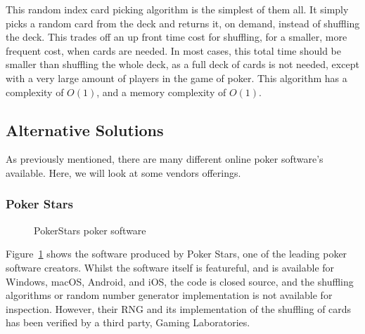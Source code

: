 \vspace{0.3cm}

This random index card picking algorithm is the simplest of them all. It simply
picks a random card from the deck and returns it, on demand, instead of
shuffling the deck. This trades off an up front time cost for shuffling, for
a smaller, more frequent cost, when cards are needed. In most cases, this
total time should be smaller than shuffling the whole deck, as a full deck
of cards is not needed, except with a very large amount of players in the game
of poker. This algorithm has a complexity of $O(1)$, and a memory complexity
of $O(1)$.

\subsection{Alternative Solutions}

As previously mentioned, there are many different online poker software's
available. Here, we will look at some vendors offerings.

\subsubsection{Poker Stars}

\begin{figure}[H]
    \caption{PokerStars poker software}%
    \label{fig:pokerstars}
\end{figure}

Figure~\ref{fig:pokerstars} shows the software produced by Poker Stars, one
of the leading poker software creators. Whilst the software itself is
featureful, and is available for Windows, macOS, Android, and iOS, the code
is closed source, and the shuffling algorithms or random number generator
implementation is not available for inspection. However, their RNG and its
implementation of the shuffling of cards has been verified by a third party,
Gaming Laboratories. \parencite{website:gaminglabs2015}

